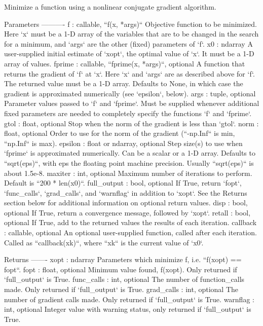 \begin{DoxyVerb}Minimize a function using a nonlinear conjugate gradient algorithm.

Parameters
----------
f : callable, ``f(x, *args)``
    Objective function to be minimized.  Here `x` must be a 1-D array of
    the variables that are to be changed in the search for a minimum, and
    `args` are the other (fixed) parameters of `f`.
x0 : ndarray
    A user-supplied initial estimate of `xopt`, the optimal value of `x`.
    It must be a 1-D array of values.
fprime : callable, ``fprime(x, *args)``, optional
    A function that returns the gradient of `f` at `x`. Here `x` and `args`
    are as described above for `f`. The returned value must be a 1-D array.
    Defaults to None, in which case the gradient is approximated
    numerically (see `epsilon`, below).
args : tuple, optional
    Parameter values passed to `f` and `fprime`. Must be supplied whenever
    additional fixed parameters are needed to completely specify the
    functions `f` and `fprime`.
gtol : float, optional
    Stop when the norm of the gradient is less than `gtol`.
norm : float, optional
    Order to use for the norm of the gradient
    (``-np.Inf`` is min, ``np.Inf`` is max).
epsilon : float or ndarray, optional
    Step size(s) to use when `fprime` is approximated numerically. Can be a
    scalar or a 1-D array.  Defaults to ``sqrt(eps)``, with eps the
    floating point machine precision.  Usually ``sqrt(eps)`` is about
    1.5e-8.
maxiter : int, optional
    Maximum number of iterations to perform. Default is ``200 * len(x0)``.
full_output : bool, optional
    If True, return `fopt`, `func_calls`, `grad_calls`, and `warnflag` in
    addition to `xopt`.  See the Returns section below for additional
    information on optional return values.
disp : bool, optional
    If True, return a convergence message, followed by `xopt`.
retall : bool, optional
    If True, add to the returned values the results of each iteration.
callback : callable, optional
    An optional user-supplied function, called after each iteration.
    Called as ``callback(xk)``, where ``xk`` is the current value of `x0`.

Returns
-------
xopt : ndarray
    Parameters which minimize f, i.e. ``f(xopt) == fopt``.
fopt : float, optional
    Minimum value found, f(xopt).  Only returned if `full_output` is True.
func_calls : int, optional
    The number of function_calls made.  Only returned if `full_output`
    is True.
grad_calls : int, optional
    The number of gradient calls made. Only returned if `full_output` is
    True.
warnflag : int, optional
    Integer value with warning status, only returned if `full_output` is
    True.


\end{DoxyVerb}
